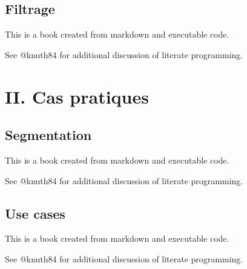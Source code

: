 \documentclass[
  letterpaper,
  DIV=11,
  numbers=noendperiod]{scrreprt}
\begin{document}
\chapter{Filtrage}\label{filtrage}

This is a book created from markdown and executable code.

See @knuth84 for additional discussion of literate programming.

\part{II. Cas pratiques}

\chapter{Segmentation}\label{segmentation}

This is a book created from markdown and executable code.

See @knuth84 for additional discussion of literate programming.

\chapter{Use cases}\label{use-cases}

This is a book created from markdown and executable code.

See @knuth84 for additional discussion of literate programming.
\end{document}
